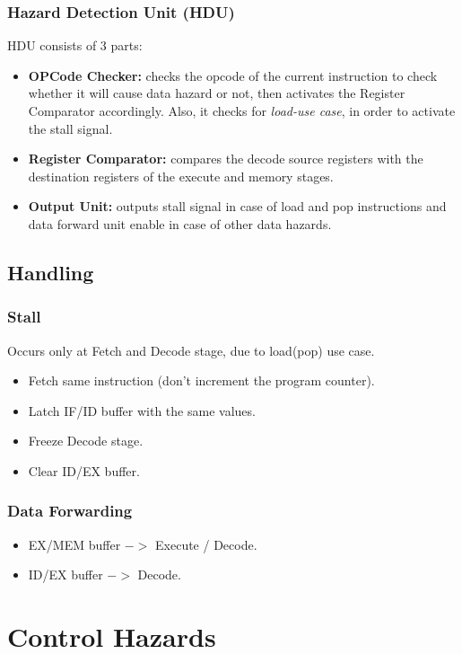 \documentclass[12pt]{report}
\begin{document}
\subsubsection{Hazard Detection Unit (HDU)}
HDU consists of 3 parts:
\begin{itemize}
    \item \textbf{OPCode Checker:} checks the opcode of the current instruction to check whether it will cause data hazard or not, then activates the Register Comparator accordingly. Also, it checks for \emph{load-use case}, in order to activate the stall signal.
    \item \textbf{Register Comparator:} compares the decode source registers with the destination registers of the execute and memory stages.
    \item \textbf{Output Unit:} outputs stall signal in case of load and pop instructions and data forward unit enable in case of other data hazards.
\end{itemize}

\subsection{Handling}

\subsubsection{Stall}
Occurs only at Fetch and Decode stage, due to load(pop) use case.
\begin{itemize}
    \item Fetch same instruction (don't increment the program counter).
    \item Latch IF/ID buffer with the same values.
    \item Freeze Decode stage.
    \item Clear ID/EX buffer.
\end{itemize}

\subsubsection{Data Forwarding}
\begin{itemize}
    \item EX/MEM buffer $->$ Execute / Decode.
    \item ID/EX buffer $->$ Decode.
\end{itemize}

\section{Control Hazards}
\end{document}
